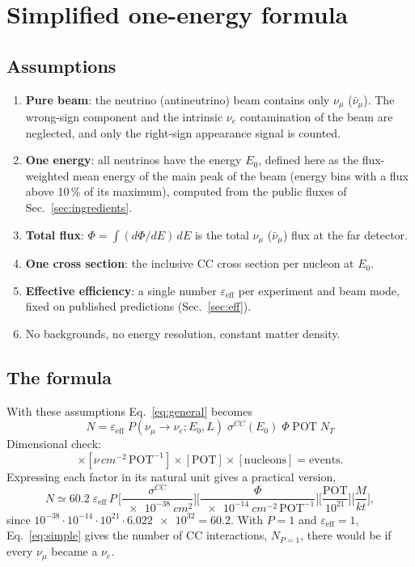 \documentclass[11pt,a4paper]{article}
\newcommand{\numu}{\nu_\mu}
\newcommand{\numubar}{\bar\nu_\mu}
\newcommand{\nue}{\nu_e}
\newcommand{\POT}{\mathrm{POT}}
\begin{document}
\section{Simplified one-energy formula}

\subsection{Assumptions}
\begin{enumerate}
  \item \textbf{Pure beam}: the neutrino (antineutrino) beam contains only $\numu$ ($\numubar$).
        The wrong-sign component and the intrinsic $\nue$ contamination of the beam are neglected,
        and only the right-sign appearance signal is counted.
  \item \textbf{One energy}: all neutrinos have the energy $E_0$, defined here as the flux-weighted mean
        energy of the main peak of the beam (energy bins with a flux above 10\,\% of its maximum),
        computed from the public fluxes of Sec.~\ref{sec:ingredients}.
  \item \textbf{Total flux}: $\Phi = \int (d\Phi/dE)\,dE$ is the total $\numu$ ($\numubar$) flux at the far detector.
  \item \textbf{One cross section}: the inclusive CC cross section per nucleon at $E_0$.
  \item \textbf{Effective efficiency}: a single number $\varepsilon_\text{eff}$ per experiment and beam mode,
        fixed on published predictions (Sec.~\ref{sec:eff}).
  \item No backgrounds, no energy resolution, constant matter density.
\end{enumerate}

\subsection{The formula}
With these assumptions Eq.~\eqref{eq:general} becomes
\begin{equation}
  \boxed{\;N = \varepsilon_\text{eff}\; P(\numu\to\nue; E_0, L)\; \sigma^{CC}(E_0)\; \Phi\; \POT\; N_T\;}
  \label{eq:simple}
\end{equation}
Dimensional check:
\begin{equation}
  [\si{cm^2}]\times[\nu\,\si{cm^{-2}}\,\POT^{-1}]\times[\POT]\times[\text{nucleons}]
  = \text{events}.
\end{equation}
Expressing each factor in its natural unit gives a practical version,
\begin{equation}
  N \simeq 60.2\;\varepsilon_\text{eff}\, P\,
  \Big[\frac{\sigma^{CC}}{\SI{e-38}{cm^2}}\Big]
  \Big[\frac{\Phi}{\SI{e-14}{cm^{-2}}\,\POT^{-1}}\Big]
  \Big[\frac{\POT}{10^{21}}\Big]
  \Big[\frac{M}{\si{kt}}\Big],
  \label{eq:practical}
\end{equation}
since $10^{-38}\cdot10^{-14}\cdot10^{21}\cdot\num{6.022e32} = 60.2$.
With $P=1$ and $\varepsilon_\text{eff}=1$, Eq.~\eqref{eq:simple} gives the number of CC interactions,
$N_{P=1}$, there would be if every $\numu$ became a $\nue$.
\end{document}
